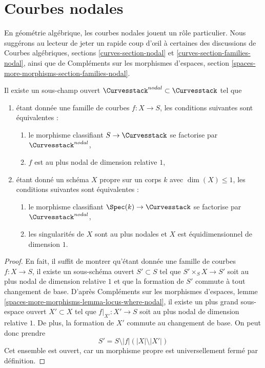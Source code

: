 \section{Courbes nodales}
\label{section-nodal-curves}

\noindent
En géométrie algébrique, les courbes nodales jouent un rôle particulier.
Nous suggérons au lecteur de jeter un rapide coup d'œil à certaines des discussions
de Courbes algébriques, sections \ref{curves-section-nodal} et
\ref{curves-section-families-nodal},
ainsi que de Compléments sur les morphismes d'espaces, section
\ref{spaces-more-morphisms-section-families-nodal}.

\begin{lemma}
\label{lemma-nodal-curves}
Il existe un sous-champ ouvert $\Curvesstack^{nodal} \subset \Curvesstack$
tel que
\begin{enumerate}
\item étant donnée une famille de courbes $f : X \to S$, les conditions suivantes sont équivalentes :
\begin{enumerate}
\item le morphisme classifiant $S \to \Curvesstack$ se factorise
par $\Curvesstack^{nodal}$,
\item $f$ est au plus nodal de dimension relative $1$,
\end{enumerate}
\item étant donné un schéma $X$ propre sur un corps $k$ avec
$\dim(X) \leq 1$, les conditions suivantes sont équivalentes :
\begin{enumerate}
\item le morphisme classifiant $\Spec(k) \to \Curvesstack$ se factorise
par $\Curvesstack^{nodal}$,
\item les singularités de $X$ sont au plus nodales et $X$
est équidimensionnel de dimension $1$.
\end{enumerate}
\end{enumerate}
\end{lemma}

\begin{proof}
En fait, il suffit de montrer qu'étant donnée une famille de courbes
$f : X \to S$, il existe un sous-schéma ouvert $S' \subset S$
tel que $S' \times_S X \to S'$ soit au plus nodal de dimension relative $1$
et que la formation de $S'$ commute à tout changement de base.
D'après Compléments sur les morphismes d'espaces, lemme
\ref{spaces-more-morphisms-lemma-locus-where-nodal},
il existe un plus grand sous-espace ouvert $X' \subset X$ tel
que $f|_{X'} : X' \to S$ soit au plus nodal de dimension relative $1$.
De plus, la formation de $X'$ commute au changement de base.
On peut donc prendre
$$
S' = S \setminus |f|(|X| \setminus |X'|)
$$
Cet ensemble est ouvert, car un morphisme propre est universellement fermé par
définition.
\end{proof}

